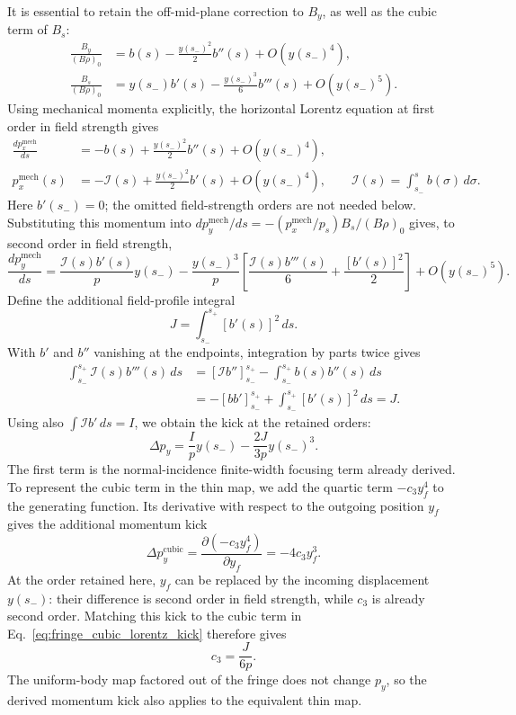 It is essential to retain the off-mid-plane correction to $B_y$, as well
as the cubic term of $B_s$:
\begin{align}
 \frac{B_y}{(B\rho)_0}&=b(s)-\frac{y(s_-)^2}{2}b''(s)+O(y(s_-)^4),\\
 \frac{B_s}{(B\rho)_0}&=y(s_-)b'(s)-\frac{y(s_-)^3}{6}b'''(s)+O(y(s_-)^5).
\end{align}
Using mechanical momenta explicitly, the horizontal Lorentz equation
at first order in field strength gives
\begin{align}
 \frac{dp_x^{\mathrm{mech}}}{ds}
 &=-b(s)+\frac{y(s_-)^2}{2}b''(s)+O(y(s_-)^4),\\
 p_x^{\mathrm{mech}}(s)
 &=-\mathcal I(s)+\frac{y(s_-)^2}{2}b'(s)+O(y(s_-)^4),
 \qquad \mathcal I(s)=\int_{s_-}^{s}b(\sigma)\,d\sigma.
\end{align}
Here $b'(s_-)=0$; the omitted field-strength orders are not needed below.
Substituting this momentum into
$dp_y^{\mathrm{mech}}/ds=-(p_x^{\mathrm{mech}}/p_s)B_s/(B\rho)_0$
gives, to second order in field strength,
\begin{equation}
 \frac{dp_y^{\mathrm{mech}}}{ds}
 =\frac{\mathcal I(s)b'(s)}{p}y(s_-)
  -\frac{y(s_-)^3}{p}\left[
       \frac{\mathcal I(s)b'''(s)}{6}
       +\frac{[b'(s)]^2}{2}\right]+O(y(s_-)^5).
\end{equation}
Define the additional field-profile integral
\begin{equation}
 J=\int_{s_-}^{s_+}[b'(s)]^2\,ds.
 \label{eq:fringe_cubic_profile_integral}
\end{equation}
With $b'$ and $b''$ vanishing at the endpoints, integration by parts twice
gives
\begin{align}
 \int_{s_-}^{s_+}\mathcal I(s)b'''(s)\,ds
 &=[\mathcal I b'']_{s_-}^{s_+}-\int_{s_-}^{s_+}b(s)b''(s)\,ds\\
 &=-[b b']_{s_-}^{s_+}+\int_{s_-}^{s_+}[b'(s)]^2\,ds=J.
\end{align}
Using also $\int\mathcal I b'\,ds=I$, we obtain the kick at the retained
orders:
\begin{equation}
 \Delta p_y=\frac{I}{p}y(s_-)-\frac{2J}{3p}y(s_-)^3.
 \label{eq:fringe_cubic_lorentz_kick}
\end{equation}
The first term is the normal-incidence finite-width focusing term already
derived. To represent the cubic term in the thin map, we add the quartic
term $-c_3y_f^4$ to the generating function. Its derivative with respect
to the outgoing position $y_f$ gives the additional momentum kick
\begin{equation}
 \Delta p_y^{\mathrm{cubic}}
 =\frac{\partial(-c_3y_f^4)}{\partial y_f}=-4c_3y_f^3.
\end{equation}
At the order retained here, $y_f$ can be replaced by the incoming
displacement $y(s_-)$: their difference is second order in field strength,
while $c_3$ is already second order. Matching this kick to the cubic
term in Eq.~\eqref{eq:fringe_cubic_lorentz_kick} therefore gives
\begin{equation}
 c_3=\frac{J}{6p}.
 \label{eq:fringe_cubic_general_coefficient}
\end{equation}
The uniform-body map factored out of the fringe does not
change $p_y$, so the derived momentum kick also applies to the equivalent
thin map.

